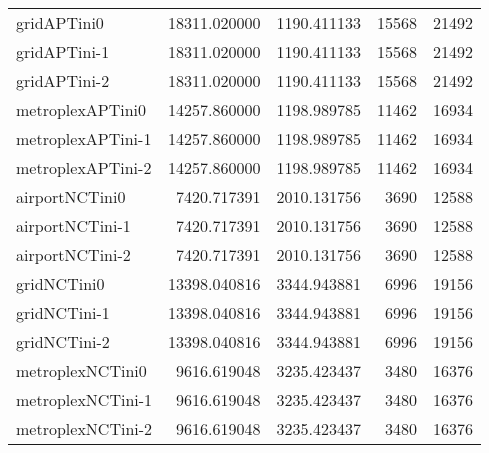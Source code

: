 \begin{table}[h]
\begin{longtable}{lrrrr}
gridAPTini0 & 18311.020000 & 1190.411133 & 15568 & 21492 \\
gridAPTini-1 & 18311.020000 & 1190.411133 & 15568 & 21492 \\
gridAPTini-2 & 18311.020000 & 1190.411133 & 15568 & 21492 \\
metroplexAPTini0 & 14257.860000 & 1198.989785 & 11462 & 16934 \\
metroplexAPTini-1 & 14257.860000 & 1198.989785 & 11462 & 16934 \\
metroplexAPTini-2 & 14257.860000 & 1198.989785 & 11462 & 16934 \\
airportNCTini0 & 7420.717391 & 2010.131756 & 3690 & 12588 \\
airportNCTini-1 & 7420.717391 & 2010.131756 & 3690 & 12588 \\
airportNCTini-2 & 7420.717391 & 2010.131756 & 3690 & 12588 \\
gridNCTini0 & 13398.040816 & 3344.943881 & 6996 & 19156 \\
gridNCTini-1 & 13398.040816 & 3344.943881 & 6996 & 19156 \\
gridNCTini-2 & 13398.040816 & 3344.943881 & 6996 & 19156 \\
metroplexNCTini0 & 9616.619048 & 3235.423437 & 3480 & 16376 \\
metroplexNCTini-1 & 9616.619048 & 3235.423437 & 3480 & 16376 \\
metroplexNCTini-2 & 9616.619048 & 3235.423437 & 3480 & 16376 \\
\end{longtable}
\end{table}

